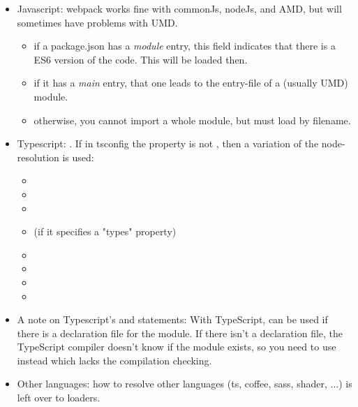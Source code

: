 \begin{itemize}
    \item Javascript: webpack works fine with commonJs, nodeJs, and AMD, but will sometimes have problems with UMD.
        \begin{itemize}
            \item if a package.json has a \emph{module} entry, this field indicates that there is a ES6 version of the code. This will be loaded then.
            \item if it has a \emph{main} entry, that one leads to the entry-file of a (usually UMD) module.
            \item otherwise, you cannot import a whole module, but must load by filename.
        \end{itemize}
    \item Typescript: . If in tsconfig the property  is not , then a variation of the node-resolution is used:
        \begin{itemize}
            \item {}
            \item {}
            \item {}
            \item {}  (if it specifies a "types" property)
            \item {}
            \item {}
            \item {}
            \item {}
        \end{itemize}
    \item A note on Typescript's  and  statements: With TypeScript,  can be used if there is a declaration file for the module. If there isn't a declaration file, the TypeScript compiler doesn't know if the module exists, so you need to use  instead which lacks the compilation checking.
    \item Other languages: how to resolve other languages (ts, coffee, sass, shader, ...) is left over to loaders.
\end{itemize}

